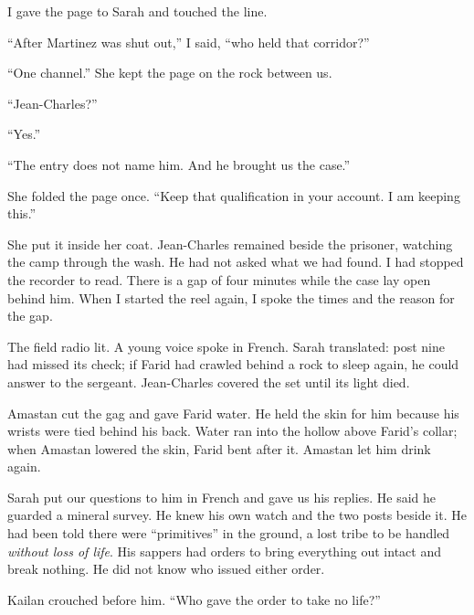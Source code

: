 I gave the page to Sarah and touched the line.\par

``After Martinez was shut out,'' I said, ``who held that corridor?''\par

``One channel.'' She kept the page on the rock between us.\par

``Jean-Charles?''\par

``Yes.''\par

``The entry does not name him. And he brought us the case.''\par

She folded the page once. ``Keep that qualification in your account. I am keeping this.''\par

She put it inside her coat. Jean-Charles remained beside the prisoner, watching the camp through the wash. He had not asked what we had found. I had stopped the recorder to read. There is a gap of four minutes while the case lay open behind him. When I started the reel again, I spoke the times and the reason for the gap.\par

The field radio lit. A young voice spoke in French. Sarah translated: post nine had missed its check; if Farid had crawled behind a rock to sleep again, he could answer to the sergeant. Jean-Charles covered the set until its light died.\par

Amastan cut the gag and gave Farid water. He held the skin for him because his wrists were tied behind his back. Water ran into the hollow above Farid's collar; when Amastan lowered the skin, Farid bent after it. Amastan let him drink again.\par

Sarah put our questions to him in French and gave us his replies. He said he guarded a mineral survey. He knew his own watch and the two posts beside it. He had been told there were ``primitives'' in the ground, a lost tribe to be handled \emph{without loss of life}. His sappers had orders to bring everything out intact and break nothing. He did not know who issued either order.\par

Kailan crouched before him. ``Who gave the order to take no life?''\par

